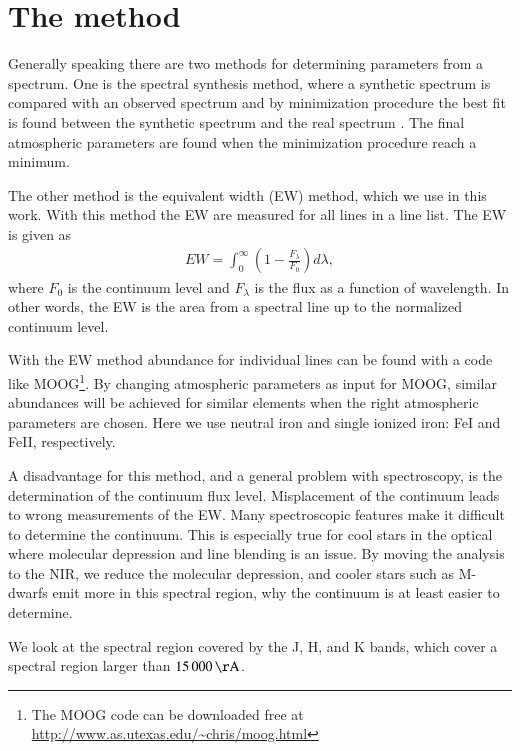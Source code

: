 \documentclass{aa}
\begin{document}
\section{The method}
\label{sec:the_method}

Generally speaking there are two methods for determining parameters from
a spectrum. One is the spectral synthesis method, where a synthetic
spectrum is compared with an observed spectrum and by minimization
procedure the best fit is found between the synthetic spectrum and the
real spectrum \citep[see e.g.][]{2012Onehag}. The final atmospheric
parameters are found when the minimization procedure reach a minimum.

The other method is the equivalent width (EW) method, which we use in this
work.  With this method the EW are measured for all lines in a line list. The
EW is given as
\begin{align}
    \label{eq:EW}
    EW = \int_0^\infty \left(1 - \frac{F_\lambda}{F_0}\right) d\lambda,
\end{align}
where $F_0$ is the continuum level and $F_\lambda$ is the flux as a function
of wavelength. In other words, the EW is the area from a spectral line up
to the normalized continuum level.

With the EW method abundance for individual lines can be found with a code like
MOOG\footnote{The MOOG code can be downloaded free at
\url{http://www.as.utexas.edu/~chris/moog.html}}. By changing atmospheric
parameters as input for MOOG, similar abundances will be achieved for similar
elements when the right atmospheric parameters are chosen. Here we use neutral
iron and single ionized iron: FeI and FeII, respectively.

A disadvantage for this method, and a general problem with spectroscopy,
is the determination of the continuum flux level. Misplacement of the
continuum leads to wrong measurements of the EW. Many spectroscopic
features make it difficult to determine the continuum. This is
especially true for cool stars in the optical where molecular depression
and line blending is an issue. By moving the analysis to the NIR, we
reduce the molecular depression, and cooler stars such as M-dwarfs emit
more in this spectral region, why the continuum is at least easier to
determine.

We look at the spectral region covered by the J, H, and K bands, which cover a
spectral region larger than $\SI{15000}{\AA}$.



\end{document}
